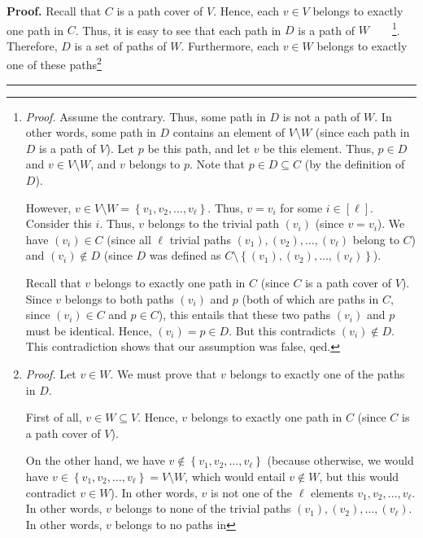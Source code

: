 \documentclass[numbers=enddot,12pt,final,onecolumn,notitlepage]{scrartcl}%
\numberwithin{exer}{section}
\theoremstyle{definition}
\newenvironment{proof}[1][Proof]{\noindent\textbf{#1.} }{\ \rule{0.5em}{0.5em}}
\newenvironment{verlong}{}{}
\begin{document}
\begin{verlong}
\begin{proof}
Recall that $C$ is a path cover of $V$. Hence, each $v\in V$ belongs to
exactly one path in $C$. Thus, it is easy to see that each path in $D$ is a
path of $W$\ \ \ \ \footnote{\textit{Proof.} Assume the contrary. Thus, some
path in $D$ is not a path of $W$. In other words, some path in $D$ contains an
element of $V\setminus W$ (since each path in $D$ is a path of $V$). Let $p$
be this path, and let $v$ be this element. Thus, $p\in D$ and $v\in V\setminus
W$, and $v$ belongs to $p$. Note that $p\in D\subseteq C$ (by the definition
of $D$).
\par
However, $v\in V\setminus W=\left\{  v_{1},v_{2},\ldots,v_{\ell}\right\}  $.
Thus, $v=v_{i}$ for some $i\in\left[  \ell\right]  $. Consider this $i$. Thus,
$v$ belongs to the trivial path $\left(  v_{i}\right)  $ (since $v=v_{i}$). We
have $\left(  v_{i}\right)  \in C$ (since all $\ell$ trivial paths $\left(
v_{1}\right)  ,\left(  v_{2}\right)  ,\ldots,\left(  v_{\ell}\right)  $ belong
to $C$) and $\left(  v_{i}\right)  \notin D$ (since $D$ was defined as
$C\setminus\left\{  \left(  v_{1}\right)  ,\left(  v_{2}\right)
,\ldots,\left(  v_{\ell}\right)  \right\}  $).
\par
Recall that $v$ belongs to exactly one path in $C$ (since $C$ is a path cover
of $V$). Since $v$ belongs to both paths $\left(  v_{i}\right)  $ and $p$
(both of which are paths in $C$, since $\left(  v_{i}\right)  \in C$ and $p\in
C$), this entails that these two paths $\left(  v_{i}\right)  $ and $p$ must
be identical. Hence, $\left(  v_{i}\right)  =p\in D$. But this contradicts
$\left(  v_{i}\right)  \notin D$. This contradiction shows that our assumption
was false, qed.}. Therefore, $D$ is a set of paths of $W$. Furthermore, each
$v\in W$ belongs to exactly one of these paths\footnote{\textit{Proof.} Let
$v\in W$. We must prove that $v$ belongs to exactly one of the paths in $D$.
\par
First of all, $v\in W\subseteq V$. Hence, $v$ belongs to exactly one path in
$C$ (since $C$ is a path cover of $V$).
\par
On the other hand, we have $v\notin\left\{  v_{1},v_{2},\ldots,v_{\ell
}\right\}  $ (because otherwise, we would have $v\in\left\{  v_{1}%
,v_{2},\ldots,v_{\ell}\right\}  =V\setminus W$, which would entail $v\notin
W$, but this would contradict $v\in W$). In other words, $v$ is not one of the
$\ell$ elements $v_{1},v_{2},\ldots,v_{\ell}$. In other words, $v$ belongs to
none of the trivial paths $\left(  v_{1}\right)  ,\left(  v_{2}\right)
,\ldots,\left(  v_{\ell}\right)  $. In other words, $v$ belongs to no paths in
}
\end{proof}
\end{verlong}
\end{document}
